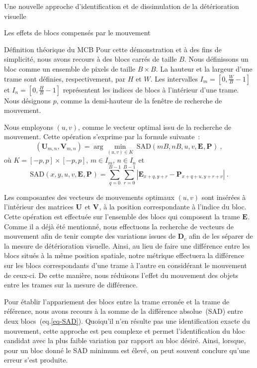 \documentclass[letterpaper, twoside, 12pt,memoire]{thETS}
\newcommand{\ltE}[1]{\mathbf{E}_{#1}}
\newcommand{\ltP}[1]{\mathbf{P}_{#1}}
\newcommand{\ltD}[1]{\mathbf{D}_{#1}}
\newcommand{\ltS}[1]{I_{#1}}
\newcommand{\ltSAD}[1]{\textrm{SAD}(#1)}
\newcommand{\ltMIN}[1]{\arg \min_{#1}}
\begin{document}
\begin{chapter}{Une nouvelle approche d'identification et de dissimulation de la
détérioration visuelle}
\begin{section}{Les effets de blocs compensés par le mouvement}
\FloatBarrier
\begin{subsection}{Définition théorique du MCB}
\label{subsect-theorique}
Pour cette démonstration et à des fins de simplicité, nous avons recours à des
blocs carrés de taille $B$. Nous définissons un bloc comme un ensemble de pixels de taille
$B\times B$. La hauteur et la largeur d'une trame sont définies, respectivement,
par $H$ et $W$. Les intervalles $\ltS{m}=[0,\frac{W}{B}-1]$ et
$\ltS{n}=[0,\frac{H}{B}-1]$ représentent les indices de blocs à l'intérieur
d'une trame. Nous désignons $p$, comme la demi-hauteur de la fenêtre de
recherche de mouvement.

Nous employons $(u,v)$, comme le vecteur optimal issu de la recherche de
mouvement. Cette opération s'exprime par la formule suivante~: 
\begin{equation}
\label{eq-Vectors}
(\mathbf{U}_{m,n}, \mathbf{V}_{m,n}) = \ltMIN{(u,v) \in K} ~ \ltSAD{mB, nB, u,
v, \ltE{}, \ltP{}} \:,
\end{equation}
où $K = [-p,p] \times [-p, p]$,  $m \in \ltS{m}$, $n \in
\ltS{n}$ et
\begin{equation}
\label{eq-SAD}
\ltSAD{x,y,u,v, \ltE{}, \ltP{}} = \sum_{q=0}^{B-1}\sum_{r=0}^{B-1} \left|
\ltE{x+q,y+r} - \ltP{x+q+u,y+r+v} \right|\:.
\end{equation}

Les composantes des vecteurs de mouvements optimaux $(u,v)$ sont insérées à l'intérieur
des matrices $\mathbf{U}_{}$ et $\mathbf{V}_{}$, à la position correspondante à
l'indice du bloc. Cette opération est effectuée sur l'ensemble des blocs qui
composent la trame $\ltE{}$. Comme il a déjà été mentionné, nous effectuons la
recherche de vecteurs de mouvement afin de tenir compte des variations issues de
$\ltD{v}$ afin de les séparer de la mesure de détérioration visuelle. Ainsi, au lieu de faire une différence entre les blocs situés à la même position spatiale, notre métrique effectuera la différence sur les blocs correspondants d'une trame à l'autre en considérant le mouvement de ceux-ci. De cette manière, nous réduisons l'effet du mouvement des objets entre les trames  sur la mesure de différence.

Pour établir l'appariement des blocs entre la trame erronée et la trame de
référence, nous avons recours à la somme de la différence absolue~(SAD) entre
deux blocs~(eq.\ref{eq-SAD}). Quoiqu'il n'en résulte pas une identification
exacte du mouvement, cette approche est peu complexe et permet l'identification
du bloc candidat avec la plus faible variation par rapport au bloc désiré. Ainsi, lorsque, pour un bloc donné le SAD minimum est élevé, on peut souvent conclure qu'une erreur s'est produite.


\end{subsection}
\end{section}
\end{chapter}
\end{document}
